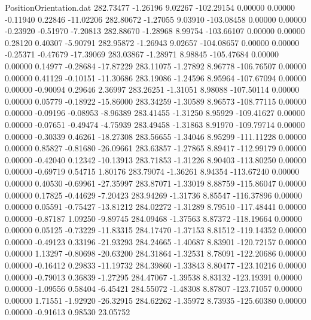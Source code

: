 \begin{filecontents}{PositionOrientation.dat}
 282.73477   -1.26196    9.02267  -102.29154    0.00000    0.00000   -0.11940    0.22846  -11.02206
 282.80672   -1.27055    9.03910  -103.08458    0.00000    0.00000   -0.23920   -0.51970   -7.20813
 282.88670   -1.28968    8.99754  -103.66107    0.00000    0.00000    0.28120    0.40307   -5.90791
 282.95872   -1.26943    9.02657  -104.08657    0.00000    0.00000   -0.25371   -0.47679  -17.39069
 283.03867   -1.28971    8.98845  -105.47684    0.00000    0.00000    0.14977   -0.28684  -17.87229
 283.11075   -1.27892    8.96778  -106.76507    0.00000    0.00000    0.41129   -0.10151  -11.30686
 283.19086   -1.24596    8.95964  -107.67094    0.00000    0.00000   -0.90094    0.29646    2.36997
 283.26251   -1.31051    8.98088  -107.50114    0.00000    0.00000    0.05779   -0.18922  -15.86000
 283.34259   -1.30589    8.96573  -108.77115    0.00000    0.00000   -0.09196   -0.08953   -8.96389
 283.41455   -1.31250    8.95929  -109.41627    0.00000    0.00000   -0.07651   -0.49474   -4.75939
 283.49458   -1.31863    8.91970  -109.79714    0.00000    0.00000   -0.30339    0.46261  -18.27308
 283.56655   -1.34046    8.95299  -111.11228    0.00000    0.00000    0.85827   -0.81680  -26.09661
 283.63857   -1.27865    8.89417  -112.99179    0.00000    0.00000   -0.42040    0.12342  -10.13913
 283.71853   -1.31226    8.90403  -113.80250    0.00000    0.00000   -0.69719    0.54715    1.80176
 283.79074   -1.36261    8.94354  -113.67240    0.00000    0.00000    0.40530   -0.69961  -27.35997
 283.87071   -1.33019    8.88759  -115.86047    0.00000    0.00000    0.17825   -0.44629   -7.20423
 283.94269   -1.31736    8.85547  -116.37896    0.00000    0.00000    0.05591   -0.75427  -13.81212
 284.02272   -1.31289    8.79510  -117.48441    0.00000    0.00000   -0.87187    1.09250   -9.89745
 284.09468   -1.37563    8.87372  -118.19664    0.00000    0.00000    0.05125   -0.73229  -11.83315
 284.17470   -1.37153    8.81512  -119.14352    0.00000    0.00000   -0.49123    0.33196  -21.93293
 284.24665   -1.40687    8.83901  -120.72157    0.00000    0.00000    1.13297   -0.80698  -20.63200
 284.31864   -1.32531    8.78091  -122.20686    0.00000    0.00000   -0.16412    0.29833  -11.19732
 284.39860   -1.33843    8.80477  -123.10216    0.00000    0.00000   -0.79013    0.36839   -1.27295
 284.47067   -1.39538    8.83132  -123.19391    0.00000    0.00000   -1.09556    0.58404   -6.45421
 284.55072   -1.48308    8.87807  -123.71057    0.00000    0.00000    1.71551   -1.92920  -26.32915
 284.62262   -1.35972    8.73935  -125.60380    0.00000    0.00000   -0.91613    0.98530   23.05752

\end{filecontents}
